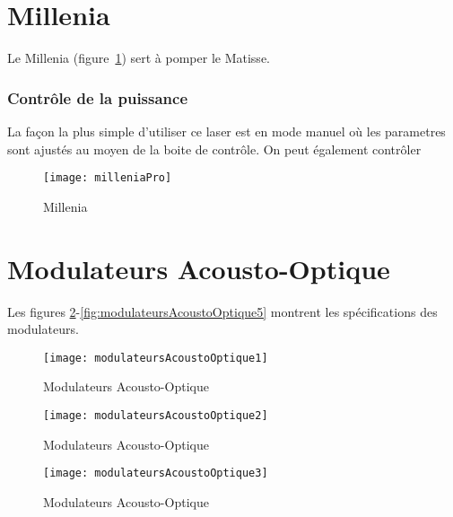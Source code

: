 \documentclass[11pt,francais]{book} %
\begin{document}


\section{Millenia}

Le Millenia (figure~\ref{fig:millenia}) sert à pomper le Matisse.

\subsubsection{Contrôle de la puissance}

La fa\c{c}on la plus simple d'utiliser ce laser est en mode manuel où les parametres sont ajustés au moyen de la boite de contrôle.
On peut également contrôler 

\begin{figure}[h!tbp]
\centering\texttt{[image: milleniaPro]}
\caption{Millenia}
\label{fig:millenia}
\end{figure}


\section{Modulateurs Acousto-Optique}

Les figures \ref{fig:modulateursAcoustoOptique1}-\ref{fig:modulateursAcoustoOptique5} montrent les spécifications des modulateurs.

\begin{figure}[h!tbp]
  \centering\texttt{[image: modulateursAcoustoOptique1]}
  \caption{Modulateurs Acousto-Optique}
  \label{fig:modulateursAcoustoOptique1}
\end{figure}

\begin{figure}[htbp]
  \centering\texttt{[image: modulateursAcoustoOptique2]}
  \caption{Modulateurs Acousto-Optique}
  \label{fig:modulateursAcoustoOptique2}
\end{figure}

\begin{figure}[htbp]
  \centering\texttt{[image: modulateursAcoustoOptique3]}
  \caption{Modulateurs Acousto-Optique}
  \label{fig:modulateursAcoustoOptique3}
\end{figure}
\end{document}

